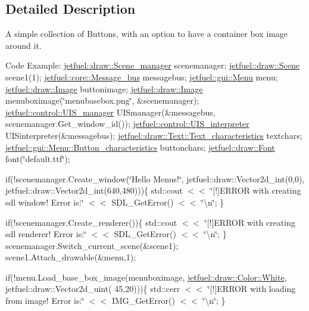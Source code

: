 \subsection{Detailed Description}
A simple collection of Buttons, with an option to have a container box image around it.

Code Example\+: \hyperlink{classjetfuel_1_1draw_1_1Scene__manager}{jetfuel\+::draw\+::\+Scene\+\_\+manager} scenemanager; \hyperlink{classjetfuel_1_1draw_1_1Scene}{jetfuel\+::draw\+::\+Scene} scene1(1); \hyperlink{classjetfuel_1_1core_1_1Message__bus}{jetfuel\+::core\+::\+Message\+\_\+bus} messagebus; \hyperlink{classjetfuel_1_1gui_1_1Menu}{jetfuel\+::gui\+::\+Menu} menu; \hyperlink{classjetfuel_1_1draw_1_1Image}{jetfuel\+::draw\+::\+Image} buttonimage; \hyperlink{classjetfuel_1_1draw_1_1Image}{jetfuel\+::draw\+::\+Image} menuboximage(\char`\"{}menubasebox.\+png\char`\"{}, \&scenemanager); \hyperlink{classjetfuel_1_1control_1_1UIS__manager}{jetfuel\+::control\+::\+U\+I\+S\+\_\+manager} U\+I\+Smanager(\&messagebus, scenemanager.\+Get\+\_\+window\+\_\+id()); \hyperlink{classjetfuel_1_1control_1_1UIS__interpreter}{jetfuel\+::control\+::\+U\+I\+S\+\_\+interpreter} U\+I\+Sinterpreter(\&messagebus); \hyperlink{structjetfuel_1_1draw_1_1Text_1_1Text__characteristics}{jetfuel\+::draw\+::\+Text\+::\+Text\+\_\+characteristics} textchars; \hyperlink{structjetfuel_1_1gui_1_1Menu_1_1Button__characteristics}{jetfuel\+::gui\+::\+Menu\+::\+Button\+\_\+characteristics} buttonchars; \hyperlink{classjetfuel_1_1draw_1_1Font}{jetfuel\+::draw\+::\+Font} font(\char`\"{}default.\+ttf\char`\"{});

if(!scenemanager.Create\+\_\+window(\char`\"{}\+Hello Menus!\char`\"{}, jetfuel\+::draw\+::\+Vector2d\+\_\+int(0,0), jetfuel\+::draw\+::\+Vector2d\+\_\+int(640,480)))\{ std\+::cout $<$$<$ \char`\"{}\mbox{[}!\mbox{]}\+E\+R\+R\+O\+R with creating sdl window! Error is\+:\char`\"{} $<$$<$ S\+D\+L\+\_\+\+Get\+Error() $<$$<$ \char`\"{}\textbackslash{}n\char`\"{}; \}

if(!scenemanager.Create\+\_\+renderer())\{ std\+::cout $<$$<$ \char`\"{}\mbox{[}!\mbox{]}\+E\+R\+R\+O\+R with creating sdl renderer! Error is\+:\char`\"{} $<$$<$ S\+D\+L\+\_\+\+Get\+Error() $<$$<$ \char`\"{}\textbackslash{}n\char`\"{}; \} scenemanager.\+Switch\+\_\+current\+\_\+scene(\&scene1); scene1.\+Attach\+\_\+drawable(\&menu,1);

if(!menu.Load\+\_\+base\+\_\+box\+\_\+image(menuboximage, \hyperlink{classjetfuel_1_1draw_1_1Color_ab75797c1cb6e4dd952037916db39b5e8}{jetfuel\+::draw\+::\+Color\+::\+White}, jetfuel\+::draw\+::\+Vector2d\+\_\+uint( 45,20)))\{ std\+::cerr $<$$<$ \char`\"{}\mbox{[}!\mbox{]}\+E\+R\+R\+O\+R with loading from image! Error is\+:\char`\"{} $<$$<$ I\+M\+G\+\_\+\+Get\+Error() $<$$<$ \char`\"{}\textbackslash{}n\char`\"{}; \}

